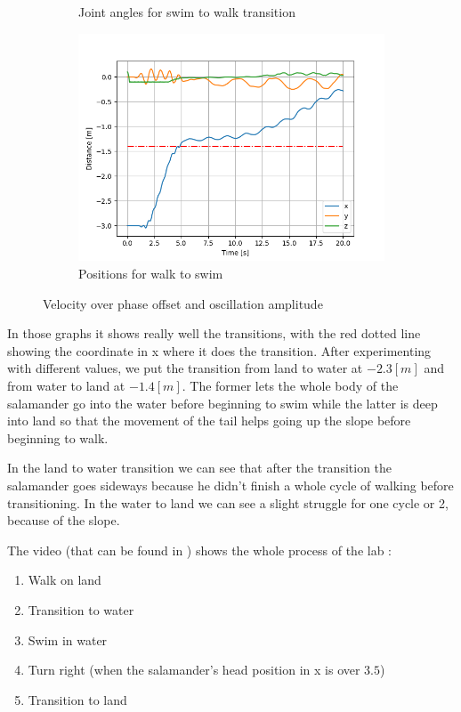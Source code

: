 \documentclass{cmc}
\begin{document}
\begin{figure}[H]
\begin{subfigure}[b]{0.5\linewidth}
    \caption{Joint angles for swim to walk transition} 
    \label{fig:exercise8g_results:c} 
  \end{subfigure}%
  \begin{subfigure}[b]{0.5\linewidth}
    \centering
    \includegraphics[width=0.9\linewidth]{figures/8g_stw_position.png} 
    \caption{Positions for walk to swim} 
    \label{fig:exercise8g_results:d} 
  \end{subfigure}
  \caption{Velocity over phase offset and oscillation amplitude}
  \label{fig:exercise8g_results} 
\end{figure}

In those graphs it shows really well the transitions, with the red dotted line showing the coordinate in x where it does the transition. After experimenting with different values, we put the transition from land to water at $-2.3[m]$ and from water to land at $-1.4[m]$. The former lets the whole body of the salamander go into the water before beginning to swim while the latter is deep into land so that the movement of the tail helps going up the slope before beginning to walk. 

In the land to water transition we can see that after the transition the salamander goes sideways because he didn't finish a whole cycle of walking before transitioning. In the water to land we can see a slight struggle for one cycle or 2, because of the slope.

The video (that can be found in ) shows the whole process of the lab :
\begin{enumerate}
\item Walk on land
\item Transition to water
\item Swim in water
\item Turn right (when the salamander's head position in x is over $3.5$)
\item Transition to land

\end{enumerate}



\label{sec:references}




\end{document}
